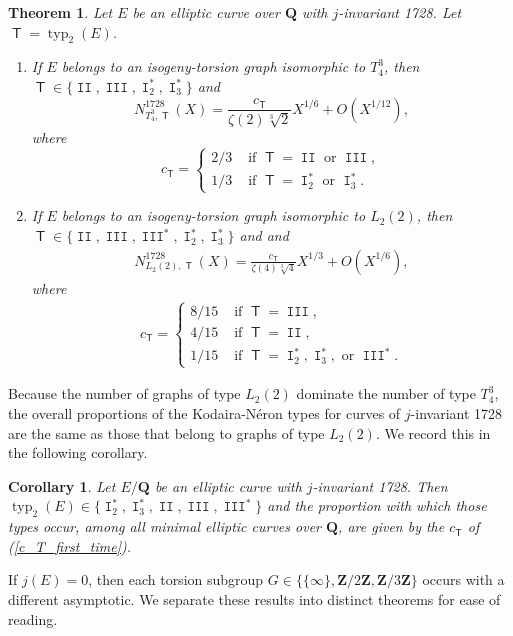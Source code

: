 \documentclass{amsart}
\newcommand{\Z}{\mathbf{Z}}
\newcommand{\Q}{\mathbf{Q}}
\newcommand{\T}{\operatorname{\mathsf{T}}}
\DeclareMathOperator{\typ}{{typ}}
\DeclareMathOperator{\I}{\mathtt{I}}
\DeclareMathOperator{\II}{\mathtt{II}}
\DeclareMathOperator{\III}{\mathtt{III}}
\numberwithin{equation}{section}
\theoremstyle{plain}
\newtheorem{thm}[equation]{Theorem}
\newtheorem{cor}[equation]{Corollary}
\theoremstyle{remark}
\begin{document}
\begin{thm} \label{j1728_thm}
Let $E$ be an elliptic curve over $\Q$ with $j$-invariant 1728.  Let $\T = \typ_2(E)$.  
\begin{enumerate}
\item If $E$ belongs to an isogeny-torsion graph isomorphic to $T_4^3$, then \\
$\T \in \lbrace \II, \III, \I_2^*, \I_3^* \rbrace$ and 
\[
N_{T_4^3,\T}^{1728}(X) = \frac{c_{\T}}{\zeta(2)\sqrt[3]{2}}X^{1/6} + O(X^{1/12}),
\]
where
\[
c_{\T} = \begin{cases} 2/3 & \text{ if } \T =   \II \text{ or }\III, \\
1/3 & \text{ if } \T = \I_2^* \text{ or } \I_3^*. \end{cases}
\]
\item If $E$ belongs to an isogeny-torsion graph isomorphic to $L_2(2)$, then \\
$\T \in \lbrace \II, \III, \III^*, \I_2^*, \I_3^* \rbrace$ and 
and 
\begin{align*}
N_{L_2(2),\T}^{1728}(X) =  \frac{c_{\T}}{\zeta(4)\sqrt[3]{4}}X^{1/3} + O(X^{1/6}),
\end{align*}
where
\begin{align} \label{c_T_first_time}
c_{\T} = \begin{cases} 8/15 & \text{ if } \T = \III, \\
4/15 & \text{ if } \T = \II, \\
1/15 & \text{ if } \T = \I_2^*,  \I_3^*, \text{ or } \III^*. \end{cases}
\end{align}
\end{enumerate}
\end{thm} 

Because the number of graphs of type $L_2(2)$ dominate the number  of type $T_4^3$, the overall proportions of the Kodaira-N\'eron types for curves of $j$-invariant 1728 are the same as those that belong to graphs of type $L_2(2)$.  We record this in the following corollary.

\begin{cor}
Let $E/\Q$ be an elliptic curve with $j$-invariant 1728.  Then $\typ_2(E) \in \lbrace \I_2^*, \I_3^*, \II, \III, \III^* \rbrace$ and the proportion with which those types occur, among all minimal elliptic curves over $\Q$, are given by the $c_{\T}$ of (\ref{c_T_first_time}).
\end{cor}

If $j(E) = 0$, then each torsion subgroup $G \in \lbrace \lbrace \infty \rbrace, \Z/2\Z, \Z/3\Z \rbrace$ occurs with a different asymptotic.  We separate these results into distinct theorems for ease of reading.
\end{document}
